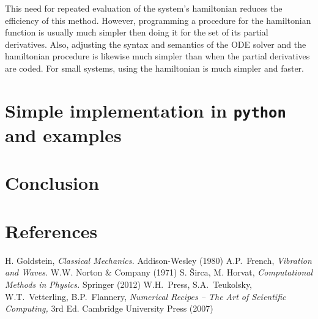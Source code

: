 \documentclass{iopart}
\begin{document}
This need for repeated evaluation of the system's hamiltonian reduces the
efficiency of this method. However, programming a procedure for the hamiltonian
function is usually much simpler then doing it for the set of its partial
derivatives.  Also, adjusting the syntax and semantics of the ODE solver and the
hamiltonian procedure is likewise much simpler than when the partial derivatives
are coded.  For small systems, using the hamiltonian is much simpler and faster.



\section{Simple implementation in \texttt{python} and examples}
\section{Conclusion}

\section*{References}
\begin{thebibliography}{99}
   H. Goldstein, \textsl{Classical Mechanics.} Addison-Wesley
  (1980)
   A.P.~French, \textsl{Vibration and Waves.} W.W. Norton \&
  Company (1971)
   S. \v{S}irca, M. Horvat, \textsl{Computational Methods in
  Physics.} Springer (2012)
   W.H.~Press, S.A.~Teukolsky, W.T.~Vetterling, B.P.~Flannery,
  \textsl{Numerical Recipes -- The Art of Scientific Computing,} 3rd Ed.
  Cambridge University Press (2007)
\end{thebibliography}
\end{document}
